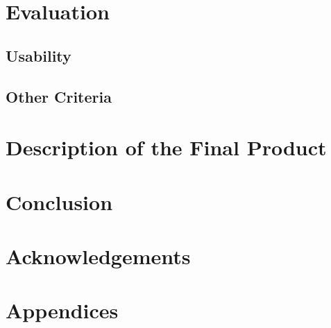 \documentclass[twocolumn]{article}
\begin{document}
\section{Evaluation}
\vspace{-1ex}

\subsection{Usability}

\subsection{Other Criteria}

\section{Description of the Final Product}
\vspace{-1ex}

\section{Conclusion}
\vspace{-1ex}

\section*{Acknowledgements}
\vspace{-1ex}

\begin{thebibliography}{9}
\end{thebibliography}

\section*{Appendices}
\vspace{-1ex}
\end{document}
